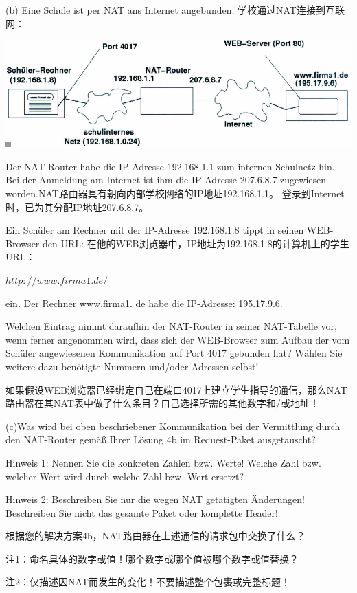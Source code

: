 \documentclass[fleqn]{article}
\begin{document}
(b) Eine Schule ist per NAT ans Internet angebunden. 学校通过NAT连接到互联网：

\includegraphics[scale = 0.6]{bild6.png}

Der NAT-Router habe die IP-Adresse 192.168.1.1 zum internen Schulnetz hin. Bei der Anmeldung am Internet ist ihm die IP-Adresse 207.6.8.7 zugewiesen worden.NAT路由器具有朝向内部学校网络的IP地址192.168.1.1。 登录到Internet时，已为其分配IP地址207.6.8.7。

Ein Schüler am Rechner mit der IP-Adresse 192.168.1.8 tippt in seinen WEB-Browser den URL: 在他的WEB浏览器中，IP地址为192.168.1.8的计算机上的学生URL：

$http://www.firma1.de/ $

\noindent ein. Der Rechner www.firma1. de habe die IP-Adresse: 195.17.9.6.

Welchen Eintrag nimmt daraufhin der NAT-Router in seiner NAT-Tabelle vor, wenn ferner angenommen wird, dass sich der WEB-Browser zum Aufbau der vom Schüler angewiesenen Kommunikation auf Port 4017 gebunden hat? Wählen Sie weitere dazu benötigte Nummern und/oder Adressen selbst!

如果假设WEB浏览器已经绑定自己在端口4017上建立学生指导的通信，那么NAT路由器在其NAT表中做了什么条目？自己选择所需的其他数字和/或地址！

(c)Was wird bei oben beschriebener Kommunikation bei der Vermittlung durch den NAT-Router gemäß Ihrer Lösung 4b im Request-Paket ausgetauscht?

Hinweis 1: Nennen Sie die konkreten Zahlen bzw. Werte! Welche Zahl bzw. welcher Wert wird durch welche Zahl bzw. Wert ersetzt?

Hinweis 2: Beschreiben Sie nur die wegen NAT getätigten Änderungen! Beschreiben Sie nicht das gesamte Paket oder komplette Header!

根据您的解决方案4b，NAT路由器在上述通信的请求包中交换了什么？

注1：命名具体的数字或值！哪个数字或哪个值被哪个数字或值替换？

注2：仅描述因NAT而发生的变化！不要描述整个包裹或完整标题！
\end{document}
